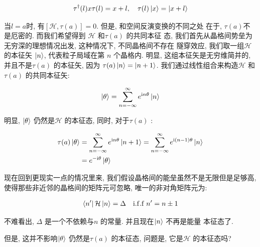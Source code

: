 \begin{equation}
  \begin{aligned}
    \tau^{\dagger}(l) x \tau(l) = x+l,\quad \tau(l) \ket{x} = \ket{x+l}
  \end{aligned}
\end{equation}

当$l = a$时, 有$[\mathcal{H}, \tau(a)] = 0$. 但是, 和空间反演变换的不同之处
在于, $\tau(a)$不是厄密的. 而我们希望得到 $\mathcal{H}$ 和$\tau(a)$ 的共同本征
态, 我们首先从晶格间势垒为无穷深的理想情况出发, 这种情况下, 不同晶格间不存在
隧穿效应, 我们取一组$\mathcal{H}$ 的本征矢 $\ket{n}$, 代表粒子局域在第 $n$ 
个晶格内. 明显, 这组本征矢是无穷维简并的, 并且不是$\tau(a)$ 的本征矢, 因为
$\tau(a) \ket{n} = \ket{n+1}$. 我们通过线性组合来构造$\mathcal{H}$ 和$\tau(a)$ 
的共同本征矢:

\begin{equation}
  \begin{aligned}
    \ket{\theta} = \sum_{n=-\infty}^{\infty} e^{{\rm i} n \theta} \ket{n}
  \end{aligned}
\end{equation}

明显, $\ket{\theta}$ 仍然是$\mathcal{H}$ 的本征态, 同时, 对于$\tau(a)$ :

\begin{equation}
  \begin{aligned}
    \tau(a) \ket{\theta} &= \sum_{n=-\infty}^{\infty} e^{{\rm i} n \theta}
    \ket{n+1} = \sum_{n=-\infty}^{\infty} e^{{\rm i} (n-1) \theta} \ket{n}\\
                         &= e^{-{\rm i} \theta} \ket{\theta}
  \end{aligned}
\end{equation} 

现在回到更现实一点的情况里来, 我们假设晶格间的能垒虽然不是无限但是足够高,
使得那些非近邻的晶格间的矩阵元可忽略, 唯一的非对角矩阵元为:

\begin{equation}
  \begin{aligned}
    \bra{n'} \mathcal{H} \ket{n} = \Delta\quad {\rm i.f.f}\; n'=n\pm 1
  \end{aligned}
\end{equation}

不难看出, $\Delta$ 是一个不依赖与$n$ 的常量. 并且现在$\ket{n}$ 不再是能量
本征态了.

但是, 这并不影响$\ket{\theta}$ 仍然是$\tau(a)$ 的本征态, 问题是, 它是$\mathcal{H}$ 
的本征态吗?

